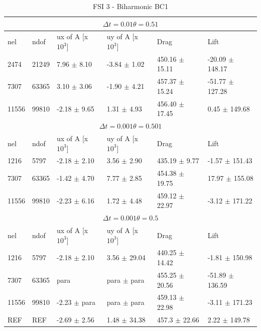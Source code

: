 \newpage


\begin{table}[h!]
\centering
\caption{FSI 3 - Biharmonic BC1}
\label{my-label}
\begin{tabular}{ |p{0.9cm}||p{0.9cm}|p{2.49cm}|p{2.49cm}|p{2.6cm}|p{2.8cm}|}
 \hline
  \multicolumn{6}{|c|}{$\Delta t = 0.01 \theta = 0.51$} \\
   \hline
nel & ndof & ux of A [x $10^{3}$]  &uy of A [x $10^{3}$]& Drag  & Lift \\
 \hline
 2474     &21249  &7.96  $\pm$ 8.10  &  -3.84   $\pm$ 1.02 & 450.16  $\pm$ 15.11  & -20.09 $\pm$ 148.17 \\
 7307    & 63365  & 3.10  $\pm$ 3.06  & -1.90   $\pm$ 4.21 & 457.37  $\pm$ 15.24 & -51.77 $\pm$ 127.28 \\
 11556   & 99810  & -2.18  $\pm$ 9.65 & 1.31    $\pm$ 4.93  & 456.40 $\pm$ 17.45 &  0.45 $\pm$ 149.68  \\
 \hline
  \multicolumn{6}{|c|}{$\Delta t = 0.001 \theta = 0.501$} \\
   \hline
 nel & ndof & ux of A [x $10^{3}$]  &uy of A [x $10^{3}$]& Drag  & Lift \\
1216 &5797  & -2.18       $\pm$ 2.10 & 3.56   $\pm$ 2.90 & 435.19       $\pm$ 9.77  & -1.57       $\pm$ 151.43 \\
7307    & 63365  & -1.42  $\pm$ 4.70 & 7.77   $\pm$ 2.85 & 454.38       $\pm$ 19.75 & 17.97       $\pm$ 155.08 \\
11556   & 99810  & -2.23  $\pm$ 6.16 & 1.72   $\pm$ 4.48 & 459.12       $\pm$ 22.97 & -3.12       $\pm$ 171.22 \\
\hline
\multicolumn{6}{|c|}{$\Delta t = 0.001 \theta = 0.5$} \\
   \hline
 nel & ndof & ux of A [x $10^{3}$]  &uy of A [x $10^{3}$]& Drag  & Lift \\
\hline
1216 &  5797  & -2.18       $\pm$ 2.10 & 3.56  $\pm$ 29.04  & 440.25       $\pm$ 14.42 & -1.81       $\pm$ 150.98  \\
7307    & 63365  & para & para $\pm$ para & 455.25 $\pm$ 20.56 & -51.89  $\pm$ 136.59 \\
11556   & 99810  & -2.23  $\pm$ para & para $\pm$ para & 459.13 $\pm$ 22.98 & -3.11 $\pm$ 171.23  \\
\hline
\hline
 REF     & REF    & -2.69 $\pm$ 2.56    & 1.48 $\pm$ 34.38   & 457.3 $\pm$ 22.66  & 2.22 $\pm$ 149.78   \\
\hline
\end{tabular}
\end{table}
